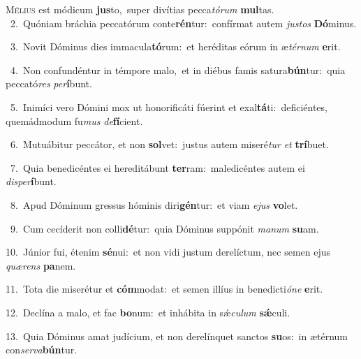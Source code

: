 \lettrine{\initial\textcolor{\initialcolor}{M}}{élius} est módicum \textbf{jus}\-to,~\star super divítias pecca\-\textit{tó}\-\textit{rum} \textbf{mul}\-tas.\\
{\numbfont\textcolor{\numbcolor}{~2.}}~Quóniam bráchia peccatórum conte\-\textbf{rén}\-tur:~\star confírmat autem \textit{jus}\-\textit{tos} \textbf{Dó}\-minus.\par
{\numbfont\textcolor{\numbcolor}{~3.}}~Novit Dóminus dies immacula\-\textbf{tó}\-rum:~\star et heréditas eórum in æ\-\textit{tér}\-\textit{num} \textbf{e}\-rit.\par
{\numbfont\textcolor{\numbcolor}{~4.}}~Non confundéntur in témpore malo,~\dagger et in diébus famis satura\-\textbf{bún}\-tur:~\star quia peccató\textit{res} \textit{per}\-\textbf{í}bunt.\par
{\numbfont\textcolor{\numbcolor}{~5.}}~Inimíci vero Dómini mox ut honorificáti fúerint et exal\-\textbf{tá}\-ti:~\star deficiéntes, quemádmodum fu\textit{mus} \textit{de}\-\textbf{fí}cient.\par
{\numbfont\textcolor{\numbcolor}{~6.}}~Mutuábitur peccátor, et non \textbf{sol}\-vet:~\star justus autem miseré\textit{tur} \textit{et} \textbf{trí}\-buet.\par
{\numbfont\textcolor{\numbcolor}{~7.}}~Quia benedicéntes ei hereditábunt \textbf{ter}\-ram:~\star maledicéntes autem ei \textit{dis}\-\textit{per}\textbf{í}bunt.\par
{\numbfont\textcolor{\numbcolor}{~8.}}~Apud Dóminum gressus hóminis diri\-\textbf{gén}\-tur:~\star et viam \textit{e}\-\textit{jus} \textbf{vo}\-let.\par
{\numbfont\textcolor{\numbcolor}{~9.}}~Cum cecíderit non colli\-\textbf{dé}\-tur:~\star quia Dóminus suppónit \textit{ma}\-\textit{num} \textbf{su}\-am.\par
{\numbfont\textcolor{\numbcolor}{10.}}~Júnior fui, étenim \textbf{sé}\-nui:~\star et non vidi justum derelíctum, nec semen ejus \textit{quæ}\-\textit{rens} \textbf{pa}\-nem.\par
{\numbfont\textcolor{\numbcolor}{11.}}~Tota die miserétur et \textbf{cóm}\-modat:~\star et semen illíus in benedicti\-\textit{ó}\-\textit{ne} \textbf{e}\-rit.\par
{\numbfont\textcolor{\numbcolor}{12.}}~Declína a malo, et fac \textbf{bo}\-num:~\star et inhábita in sǽ\-\textit{cu}\-\textit{lum} \textbf{sǽ}\-culi.\par
{\numbfont\textcolor{\numbcolor}{13.}}~Quia Dóminus amat judícium, et non derelínquet sanctos \textbf{su}\-os:~\star in ætérnum con\-\textit{ser}\-\textit{va}\textbf{bún}tur.\par
